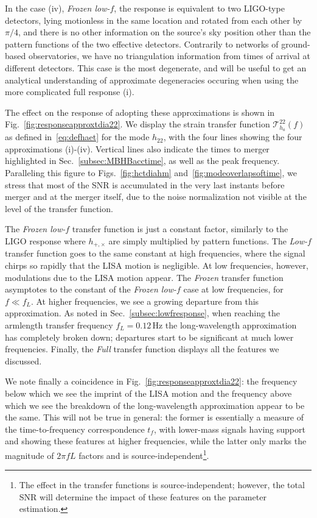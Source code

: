 \documentclass[aps,showpacs,twocolumn,prd,superscriptaddress,nofootinbib]{revtex4-1}
\newcommand\calT{{\mathcal{T}}}
\newcommand{\Hz}{\,\mathrm{Hz}}
\newcommand{\tf}{t_{f}}
\begin{document}
In the case (iv), \textit{Frozen low-$f$}, the response is equivalent to two LIGO-type detectors, lying motionless in the same location and rotated from each other by $\pi/4$, and there is no other information on the source's sky position other than the pattern functions of the two effective detectors. Contrarily to networks of ground-based observatories, we have no triangulation information from times of arrival at different detectors. This case is the most degenerate, and will be useful to get an analytical understanding of approximate degeneracies occuring when using the more complicated full response (i). 

The effect on the response of adopting these approximations is shown in Fig.~\ref{fig:responseapproxtdia22}. We display the strain transfer function $\calT_{h_{a}}^{22}(f)$ as defined in~\eqref{eq:defhaet} for the mode $h_{22}$, with the four lines showing the four approximations (i)-(iv). Vertical lines also indicate the times to merger highlighted in Sec.~\ref{subsec:MBHBacctime}, as well as the peak frequency. Paralleling this figure to Figs.~\ref{fig:hctdiahm} and~\ref{fig:modeoverlapsoftime}, we stress that most of the SNR is accumulated in the very last instants before merger and at the merger itself, due to the noise normalization not visible at the level of the transfer function.

The \textit{Frozen low-$f$} transfer function is just a constant factor, similarly to the LIGO response where $h_{+,\times}$ are simply multiplied by pattern functions. The \textit{Low-$f$} transfer function goes to the same constant at high frequencies, where the signal chirps so rapidly that the LISA motion is negligible. At low frequencies, however, modulations due to the LISA motion appear. The \textit{Frozen} transfer function asymptotes to the constant of the \textit{Frozen low-$f$} case at low frequencies, for $f \ll f_{L}$. At higher frequencies, we see a growing departure from this approximation. As noted in Sec.~\ref{subsec:lowfresponse}, when reaching the armlength transfer frequency $f_{L} = 0.12 \Hz$ the long-wavelength approximation has completely broken down; departures start to be significant at much lower frequencies. Finally, the \textit{Full} transfer function displays all the features we discussed.

We note finally a coincidence in Fig.~\ref{fig:responseapproxtdia22}: the frequency below which we see the imprint of the LISA motion and the frequency above which we see the breakdown of the long-wavelength approximation appear to be the same. This will not be true in general: the former is essentially a measure of the time-to-frequency correspondence $\tf$, with lower-mass signals having support and showing these features at higher frequencies, while the latter only marks the magnitude of $2\pi f L$ factors and is source-independent\footnote{The effect in the transfer functions is source-independent; however, the total SNR will determine the impact of these features on the parameter estimation.}.
\end{document}
